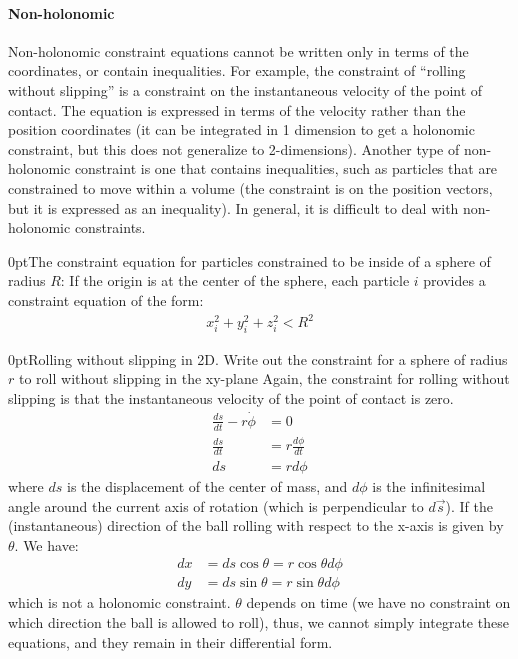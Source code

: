 \paragraph{Non-holonomic}
Non-holonomic constraint equations cannot be written only in terms of the coordinates, or contain inequalities. For example, the constraint of ``rolling without slipping'' is a constraint on the instantaneous velocity of the point of contact. The equation is expressed in terms of the velocity rather than the position coordinates (it can be integrated in 1 dimension to get a holonomic constraint, but this does not generalize to 2-dimensions). Another type of non-holonomic constraint is one that contains inequalities, such as particles that are constrained to move within a volume (the constraint is on the position vectors, but it is expressed as an inequality). In general, it is difficult to deal with non-holonomic constraints.
\begin{example}{0pt}{The constraint equation for particles constrained to be inside of a sphere of radius $R$:}{}
If the origin is at the center of the sphere, each particle $i$ provides a constraint equation of the form:
\begin{align*}
x_i^2+y_i^2+z_i^2<R^2
\end{align*}
\end{example}
\begin{example}{0pt}{Rolling without slipping in 2D. Write out the constraint for a sphere of radius $r$ to roll without slipping in the xy-plane}{}
Again, the constraint for rolling without slipping is that the instantaneous velocity of the point of contact is zero. 
\begin{align*}
\frac{ds}{dt}-r\dot{\phi}&=0\nonumber\\
\frac{ds}{dt}&=r\frac{d\phi}{dt}\nonumber\\
ds&=r d\phi
\end{align*}
where $ds$ is the displacement of the center of mass, and $d\phi$ is the infinitesimal angle around the current axis of rotation (which is perpendicular to $d\vec{s}$). If the (instantaneous) direction of the ball rolling with respect to the x-axis is given by $\theta$. We have:
\begin{align*}
dx&=ds\cos{\theta} =r\cos{\theta}d\phi\nonumber\\
dy&=ds\sin{\theta} =r\sin{\theta}d\phi\nonumber
\end{align*}
which is not a holonomic constraint. $\theta$ depends on time (we have no constraint on which direction the ball is allowed to roll), thus, we cannot simply integrate these equations, and they remain in their differential form.
\end{example}
